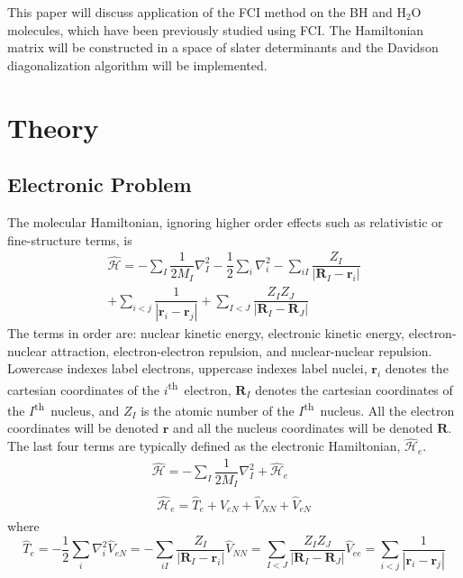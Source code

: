 \documentclass[final,3p,times,twocolumn]{elsarticle}
\newcommand{\ssth}{\textsuperscript{th}}
\newcommand{\ham}{\hat{\mathcal{H}}}
\begin{document}
This paper will discuss application of the FCI method on the BH and H$_2$O molecules, which have been previously studied using FCI.\cite{handy-1983} The Hamiltonian matrix will be constructed in a space of slater determinants and the Davidson diagonalization algorithm will be implemented. 

\section{Theory}
\subsection{Electronic Problem} \label{sec:elproblem}
The molecular Hamiltonian, ignoring higher order effects such as relativistic or fine-structure terms, is
\begin{equation}
\begin{gathered}
\hat{\mathcal H} = - \sum_I \dfrac{1}{2M_I} \nabla_I^2 -\dfrac{1}{2} \sum_i \nabla_i^2 - \sum_{iI} \dfrac{Z_I}{|\mathbf{R}_I - \mathbf{r}_i|} \\
+ \sum_{i < j} \dfrac{1}{|\mathbf{r}_i - \mathbf{r}_j|} + \sum_{I < J} \dfrac{Z_IZ_J}{|\mathbf{R}_I - \mathbf{R}_J|}
\end{gathered}
\end{equation}
The terms in order are: nuclear kinetic energy, electronic kinetic energy, electron-nuclear attraction, electron-electron repulsion, and nuclear-nuclear repulsion. Lowercase indexes label electrons, uppercase indexes label nuclei, $\mathbf{r}_i$ denotes the cartesian coordinates of the $i$\ssth\ electron, $\mathbf{R}_I$ denotes the cartesian coordinates of the $I$\ssth\ nucleus, and $Z_I$ is the atomic number of the $I$\ssth\ nucleus. All the electron coordinates will be denoted $\mathbf{r}$ and all the nucleus coordinates will be denoted $\mathbf{R}$. The last four terms are typically defined as the electronic Hamiltonian, $\ham_e$.
\begin{gather}
\hat{\mathcal H} = - \sum_I \dfrac{1}{2M_I} \nabla_I^2 + \ham_e \\
\begin{gathered}\label{eq:hame}
\ham_e = \hat T_e + \hat V_{eN} + \hat V_{NN} + \hat V_{eN}
\end{gathered}
\end{gather}
where
\begin{subequations}
\begin{equation}
\hat T_e = -\dfrac{1}{2} \sum_i \nabla_i^2 
\end{equation}
\begin{equation}
\hat V_{eN} = - \sum_{iI} \dfrac{Z_I}{|\mathbf{R}_I - \mathbf{r}_i|}
\end{equation}
\begin{equation} \label{eq:vnn}
\hat V_{NN} = \sum_{I < J} \dfrac{Z_IZ_J}{|\mathbf{R}_I - \mathbf{R}_J|}
\end{equation}
\begin{equation}
\hat V_{ee} = \sum_{i < j} \dfrac{1}{|\mathbf{r}_i - \mathbf{r}_j|}
\end{equation}
\end{subequations}
\end{document}
